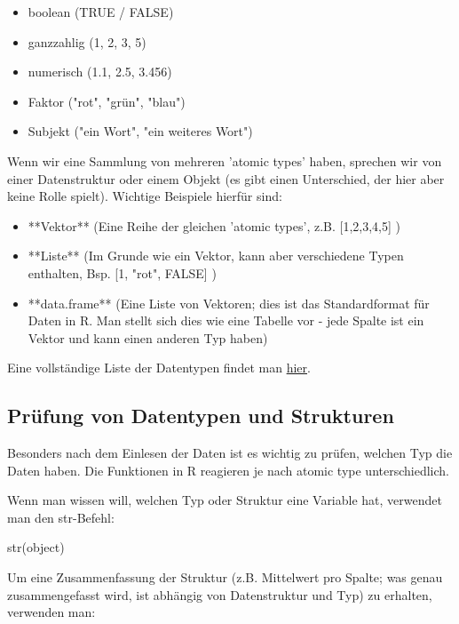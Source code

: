 \documentclass[a4paper,twoside]{tufte-book}\usepackage[]{graphicx}\usepackage[]{color}
\begin{document}
\begin{appendices}
  \begin{itemize}
		\item boolean (TRUE / FALSE)
		\item ganzzahlig (1, 2, 3, 5)
		\item numerisch (1.1, 2.5, 3.456)
		\item Faktor ("rot", "grün", "blau")
		\item Subjekt ("ein Wort", "ein weiteres Wort")
	\end{itemize}

Wenn wir eine Sammlung von mehreren 'atomic types' haben, sprechen wir von einer Datenstruktur oder einem Objekt (es gibt einen Unterschied, der hier aber keine Rolle spielt). Wichtige Beispiele hierfür sind:

  \begin{itemize}
		\item **Vektor** (Eine Reihe der gleichen 'atomic types', z.B. [1,2,3,4,5] )
		\item **Liste** (Im Grunde wie ein Vektor, kann aber verschiedene Typen enthalten, Bsp. [1, "rot", FALSE] )
		\item **data.frame** (Eine Liste von Vektoren; dies ist das Standardformat für Daten in R. Man stellt sich dies wie eine Tabelle vor - jede Spalte ist ein Vektor und kann einen anderen Typ haben)
	\end{itemize}

Eine vollständige Liste der Datentypen findet man \href{http://www.statmethods.net/input/datatypes.html}{hier}. 
 
\subsection{Prüfung von Datentypen und Strukturen}

Besonders nach dem Einlesen der Daten ist es wichtig zu prüfen, welchen Typ die Daten haben. Die Funktionen in R reagieren je nach atomic type unterschiedlich.

Wenn man wissen will, welchen Typ oder Struktur eine Variable hat, verwendet man den str-Befehl:

\begin{Schunk}
\begin{Sinput}
str(object)
\end{Sinput}
\end{Schunk}

Um eine Zusammenfassung der Struktur (z.B. Mittelwert pro Spalte; was genau zusammengefasst wird, ist abhängig von Datenstruktur und Typ) zu erhalten, verwenden man:


\end{appendices}
\end{document}
